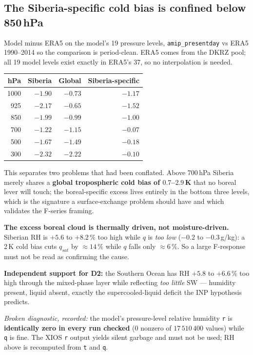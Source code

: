 \documentclass[10pt]{article}
\begin{document}
\subsection{The Siberia-specific cold bias is confined below 850\,hPa}\label{sub:vprof}
Model minus ERA5 on the model's 19 pressure levels, \texttt{amip\_presentday} vs ERA5
1990--2014 so the comparison is period-clean. ERA5 comes from the DKRZ pool; all 19 model
levels exist exactly in ERA5's 37, so no interpolation is needed.

\begin{center}\footnotesize
\begin{tabular}{r r r r}
\toprule
hPa & Siberia & Global & \textbf{Siberia-specific} \\
\midrule
1000 & $-1.90$ & $-0.73$ & $\mathbf{-1.17}$ \\
 925 & $-2.17$ & $-0.65$ & $\mathbf{-1.52}$ \\
 850 & $-1.99$ & $-0.99$ & $\mathbf{-1.00}$ \\
 700 & $-1.22$ & $-1.15$ & $-0.07$ \\
 500 & $-1.67$ & $-1.49$ & $-0.18$ \\
 300 & $-2.32$ & $-2.22$ & $-0.10$ \\
\bottomrule
\end{tabular}
\end{center}

\noindent This separates two problems that had been conflated. Above 700\,hPa Siberia merely
shares a \textbf{global tropospheric cold bias of $0.7$--$2.9$\,K} that no boreal lever will
touch; the boreal-specific excess lives entirely in the bottom three levels, which is the
signature a surface-exchange problem should have and which validates the F-series framing.

\textbf{The excess boreal cloud is thermally driven, not moisture-driven.} Siberian RH is
$+5.6$ to $+8.2\,\%$ too high while $q$ is \emph{too low} ($-0.2$ to $-0.3$\,g/kg): a 2\,K cold
bias cuts $q_{sat}$ by $\approx14\,\%$ while $q$ falls only $\approx6\,\%$. So a large
F-response must not be read as confirming the cause.

\textbf{Independent support for D2:} the Southern Ocean has RH $+5.8$ to $+6.6\,\%$ too high
through the mixed-phase layer while reflecting \emph{too little} SW --- humidity present,
liquid absent, exactly the supercooled-liquid deficit the INP hypothesis predicts.

\emph{Broken diagnostic, recorded:} the model's pressure-level relative humidity \texttt{r} is
\textbf{identically zero in every run checked} ($0$ nonzero of $17\,510\,400$ values) while
\texttt{q} is fine. The XIOS \texttt{r} output yields silent garbage and must not be used; RH
above is recomputed from \texttt{t} and \texttt{q}.
\end{document}
